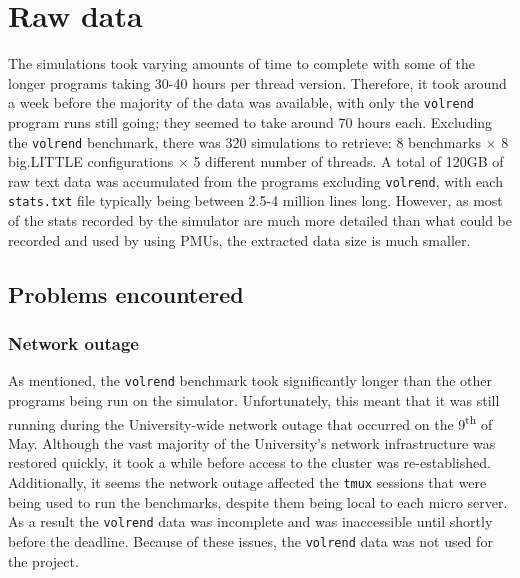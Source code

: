 \section{Raw data}
The simulations took varying amounts of time to complete with some of the longer
programs taking 30-40 hours per thread version. Therefore, it took around a week
before the majority of the data was available, with only the \texttt{volrend} 
program runs still going; they seemed to take around 70 hours each. Excluding 
the \texttt{volrend} benchmark, there was 320 simulations to retrieve: 8 
benchmarks $\times$ 8 big.LITTLE configurations $\times$ 5 different number of 
threads. A total of 120GB of raw text data was accumulated from the programs 
excluding \texttt{volrend}, with each \texttt{stats.txt} file typically being 
between 2.5-4 million lines long. However, as most of the stats recorded by the 
simulator are much more detailed than what could be recorded and used by using 
PMUs, the extracted data size is much smaller.

    \subsection{Problems encountered}
        \subsubsection{Network outage}
        As mentioned, the \texttt{volrend} benchmark took significantly longer 
        than the other programs being run on the simulator. Unfortunately, this 
        meant that it was still running during the University-wide network 
        outage that occurred on the 9\textsuperscript{th} of May. Although the 
        vast majority of the University's network infrastructure was restored 
        quickly, it took a while before access to the cluster was 
        re-established. Additionally, it seems the network outage affected the 
        \texttt{tmux} sessions that were being used to run the benchmarks, 
        despite them being local to each micro server. As a result the 
        \texttt{volrend} data was incomplete and was inaccessible until shortly 
        before the deadline. Because of these issues, the \texttt{volrend} data 
        was not used for the project.
    
